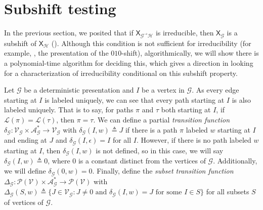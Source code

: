 \documentclass[hidelinks]{report}
\newcommand{\Ac}{\mathcal{A}}  %
\newcommand{\Lc}{\mathcal{L}}  %
\newcommand{\Gc}{\mathcal{G}}  %
\newcommand{\Hc}{\mathcal{H}}  %
\newcommand{\Vc}{\mathcal{V}}
\newcommand{\Bc}{\mathcal{B}}
\newcommand{\GtH}{{\Gc^\to\Hc}}
\newcommand{\shift}[1]{\mathsf{X}_{#1}}
\newcommand{\term}[1]{\textit{#1}}
\theoremstyle{definition}
\begin{document}

\chapter{Subshift testing}

In the previous section, we posited that if \(\shift{\GtH}\) is irreducible, then \(\shift{\Gc}\) is a subshift of \(\shift{\Hc}\) ().
Although this condition is not sufficient for irreducibility (for example, , the presentation of the \(010\)-shift), algorithmically, we will show there is a 
polynomial-time algorithm for deciding this, which gives a direction in looking for 
a characterization of irreducibility conditional on this subshift property.

Let \(\Gc\) be a deterministic presentation and \(I\) be a vertex in \(\Gc\). 
As every edge starting at \(I\) is labeled uniquely, we can see 
that every path starting at \(I\) is also labeled uniquely. That is to say, for paths 
\(\pi\) and \(\tau\) both starting at \(I\), if \(\Lc(\pi) = \Lc(\tau)\), then \(\pi = \tau\). We can 
define a partial \term{transition function} \(\delta_\Gc : \Vc_\Gc \times \Ac_\Gc^* \to \Vc_\Gc\) 
with \(\delta_\Gc(I, w) \triangleq J\) if there is a path \(\pi\) labeled \(w\) starting 
at \(I\) and ending at \(J\) and \(\delta_\Gc(I, \epsilon) = I\) for all \(I\). However, if there is no path labeled \(w\) starting at \(I\),
then \(\delta_\Gc(I, w)\) is not defined, so in this case, we will say \(\delta_\Gc(I, w) \triangleq 0\),
where \(0\) is a constant distinct from the vertices of \(\Gc\). Additionally, we 
will define \(\delta_\Gc(0, w) = 0\). Finally, define 
the \term{subset transition function} \(\Delta_\Gc : \mathcal{P}(\Vc) \times \Ac_\Gc^* \to \mathcal{P}(\Vc)\)
with \(\Delta_\Gc(S, w) \triangleq \{ J \in \Vc_\Gc : J \neq 0 \text{ and } \delta_\Gc(I, w) = J \text{ for some } I \in S\}\)
for all subsets \(S\) of vertices of \(\Gc\).
\end{document}
